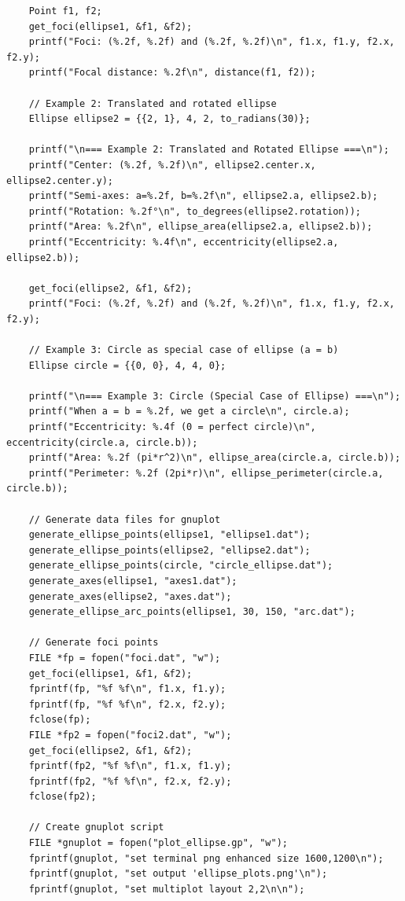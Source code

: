 \documentclass[a4paper,10pt]{article}
\begin{document}
{\begin{verbatim}
    Point f1, f2;
    get_foci(ellipse1, &f1, &f2);
    printf("Foci: (%.2f, %.2f) and (%.2f, %.2f)\n", f1.x, f1.y, f2.x, f2.y);
    printf("Focal distance: %.2f\n", distance(f1, f2));

    // Example 2: Translated and rotated ellipse
    Ellipse ellipse2 = {{2, 1}, 4, 2, to_radians(30)};

    printf("\n=== Example 2: Translated and Rotated Ellipse ===\n");
    printf("Center: (%.2f, %.2f)\n", ellipse2.center.x, ellipse2.center.y);
    printf("Semi-axes: a=%.2f, b=%.2f\n", ellipse2.a, ellipse2.b);
    printf("Rotation: %.2f°\n", to_degrees(ellipse2.rotation));
    printf("Area: %.2f\n", ellipse_area(ellipse2.a, ellipse2.b));
    printf("Eccentricity: %.4f\n", eccentricity(ellipse2.a, ellipse2.b));

    get_foci(ellipse2, &f1, &f2);
    printf("Foci: (%.2f, %.2f) and (%.2f, %.2f)\n", f1.x, f1.y, f2.x, f2.y);

    // Example 3: Circle as special case of ellipse (a = b)
    Ellipse circle = {{0, 0}, 4, 4, 0};

    printf("\n=== Example 3: Circle (Special Case of Ellipse) ===\n");
    printf("When a = b = %.2f, we get a circle\n", circle.a);
    printf("Eccentricity: %.4f (0 = perfect circle)\n", eccentricity(circle.a, circle.b));
    printf("Area: %.2f (pi*r^2)\n", ellipse_area(circle.a, circle.b));
    printf("Perimeter: %.2f (2pi*r)\n", ellipse_perimeter(circle.a, circle.b));

    // Generate data files for gnuplot
    generate_ellipse_points(ellipse1, "ellipse1.dat");
    generate_ellipse_points(ellipse2, "ellipse2.dat");
    generate_ellipse_points(circle, "circle_ellipse.dat");
    generate_axes(ellipse1, "axes1.dat");
    generate_axes(ellipse2, "axes.dat");
    generate_ellipse_arc_points(ellipse1, 30, 150, "arc.dat");

    // Generate foci points
    FILE *fp = fopen("foci.dat", "w");
    get_foci(ellipse1, &f1, &f2);
    fprintf(fp, "%f %f\n", f1.x, f1.y);
    fprintf(fp, "%f %f\n", f2.x, f2.y);
    fclose(fp);
    FILE *fp2 = fopen("foci2.dat", "w");
    get_foci(ellipse2, &f1, &f2);
    fprintf(fp2, "%f %f\n", f1.x, f1.y);
    fprintf(fp2, "%f %f\n", f2.x, f2.y);
    fclose(fp2);

    // Create gnuplot script
    FILE *gnuplot = fopen("plot_ellipse.gp", "w");
    fprintf(gnuplot, "set terminal png enhanced size 1600,1200\n");
    fprintf(gnuplot, "set output 'ellipse_plots.png'\n");
    fprintf(gnuplot, "set multiplot layout 2,2\n\n");


\end{verbatim}}
\end{document}
